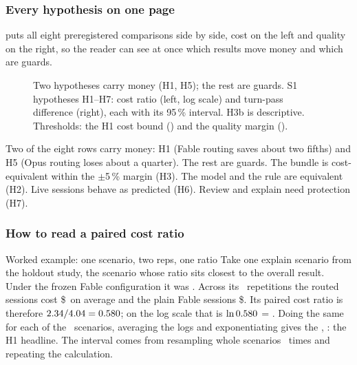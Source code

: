\subsubsection{Every hypothesis on one page}

 puts all eight preregistered comparisons side by side, cost on the left and quality on the right, so the reader can see at once which results move money and which are guards.

\begin{figure}[htbp]
\centering
{}\par\smallskip

\caption{Two hypotheses carry money (H1, H5); the rest are guards. S1 hypotheses H1--H7: cost ratio (left, log scale) and turn-pass difference (right), each with its 95\,\%
interval. H3b is descriptive. Thresholds: the H1 cost bound (\SThreshOne) and the quality margin (\NIMargin).}
\label{fig:s1forest}
\end{figure}

\begin{keyidea}
Two of the eight rows carry money: H1 (Fable routing saves about two fifths) and H5 (Opus routing loses about a
quarter). The rest are guards. The bundle is cost-equivalent within the \(\pm\)5\,\% margin (H3). The model and the rule are
equivalent (H2). Live sessions behave as predicted (H6). Review and explain need protection (H7).
\end{keyidea}

\subsubsection{How to read a paired cost ratio}\label{sec:worked}

\begin{casecard}{Worked example: one scenario, two reps, one ratio}
Take one explain scenario from the holdout study, the scenario whose ratio sits closest to the overall result. Under the frozen Fable
configuration it was \WxArm. Across its \WxReps\ repetitions the routed sessions cost \$\WxRouted\ on average and the
plain Fable sessions \$\WxPlain. Its paired cost ratio is therefore $2.34 / 4.04 = 0.580$; on the log scale
that is $\ln 0.580$ = \WxLog. Doing the same for each of the \WxNScen\ scenarios, averaging the logs and
exponentiating gives the , \WxGM: the H1 headline. The interval comes from resampling whole
scenarios \SResamples\ times and repeating the calculation.
\end{casecard}

